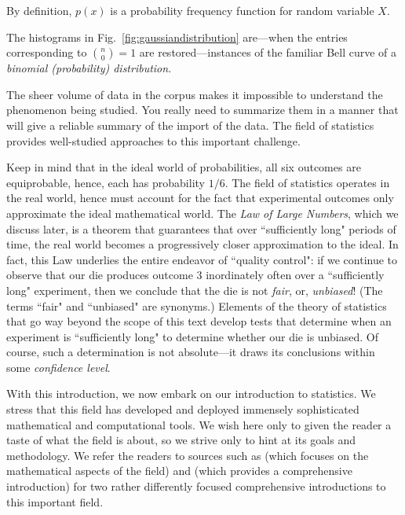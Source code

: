 By definition, $p(x)$ is a probability frequency function for random variable $X$.

\medskip


 
 

The histograms in Fig.~\ref{fig:gaussiandistribution} are---when the entries 
corresponding to $\displaystyle {n \choose 0} = 1$ are restored---instances of the
familiar Bell curve of a {\em binomial (probability) distribution}.

\medskip
 
The sheer volume of data in the corpus makes it impossible to understand the phenomenon 
being studied.  You really need to summarize them 
in a manner that will give a reliable summary of the import of the data.  The field of statistics provides well-studied approaches to this important challenge.
 
  

  
Keep in mind that in the ideal world of probabilities, all six outcomes are equiprobable, hence, 
each has probability $1/6$.  The field of statistics operates in the real world, hence must 
account for the fact that experimental outcomes only approximate the ideal mathematical world.  
The {\it Law of Large Numbers}, which we discuss later, is a theorem that guarantees that over 
``sufficiently long" periods of time, the real world becomes a progressively closer approximation 
to the ideal. In fact, this Law underlies the entire endeavor of ``quality control": if we continue to 
observe that our die produces outcome $3$ inordinately often over a ``sufficiently long" 
experiment, then we conclude that the die is not {\em fair}, or, {\em unbiased}!  (The terms
``fair" and ``unbiased" are synonyms.) Elements of the theory of statistics that go way beyond 
the scope of this text develop tests that determine when an experiment is ``sufficiently long" to 
determine whether our die is unbiased.  Of course, such a determination is not absolute---it
draws its conclusions within some {\em confidence level}.

With this introduction, we now embark on our introduction to statistics.  We stress that this
field has developed and deployed immensely sophisticated mathematical and
computational tools.  We wish here only to given the reader a taste of what the field is
about, so we strive only to hint at its goals and methodology.  We refer the readers to sources
such as \cite{Hoel58} (which focuses on the mathematical aspects of the field) and 
\cite{Bremaud17}  (which provides a comprehensive introduction) for two rather differently
focused comprehensive introductions to this important field.

